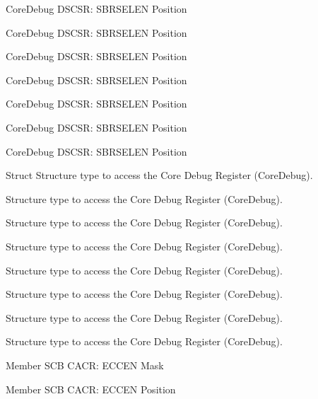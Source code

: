 \begin{DoxyRefList}
\label{deprecated__deprecated000650}%
%
Core\+Debug DSCSR\+: SBRSELEN Position 

\label{deprecated__deprecated000097}%
%
Core\+Debug DSCSR\+: SBRSELEN Position 

\label{deprecated__deprecated000548}%
%
Core\+Debug DSCSR\+: SBRSELEN Position 

\label{deprecated__deprecated000151}%
%
Core\+Debug DSCSR\+: SBRSELEN Position 

\label{deprecated__deprecated000445}%
%
Core\+Debug DSCSR\+: SBRSELEN Position 

\label{deprecated__deprecated000369}%
%
Core\+Debug DSCSR\+: SBRSELEN Position 

\label{deprecated__deprecated000290}%
%
Core\+Debug DSCSR\+: SBRSELEN Position  
\item[Struct \doxylink{structCoreDebug__Type}{Core\+Debug\+\_\+\+Type} ]\label{deprecated__deprecated000104}%
%
Structure type to access the Core Debug Register (Core\+Debug). 

\label{deprecated__deprecated000557}%
%
Structure type to access the Core Debug Register (Core\+Debug). 

\label{deprecated__deprecated000158}%
%
Structure type to access the Core Debug Register (Core\+Debug). 

\label{deprecated__deprecated000455}%
%
Structure type to access the Core Debug Register (Core\+Debug). 

\label{deprecated__deprecated000243}%
%
Structure type to access the Core Debug Register (Core\+Debug). 

\label{deprecated__deprecated000376}%
%
Structure type to access the Core Debug Register (Core\+Debug). 

\label{deprecated__deprecated000300}%
%
Structure type to access the Core Debug Register (Core\+Debug). 

\label{deprecated__deprecated000004}%
%
Structure type to access the Core Debug Register (Core\+Debug).  
\item[Member \doxylink{group__CMSIS__SCB_ga7456a0b93710e8b9fa2b94c946e96c5c}{SCB\+\_\+\+CACR\+\_\+\+ECCEN\+\_\+\+Msk} ]\label{deprecated__deprecated000556}%
%
SCB CACR\+: ECCEN Mask  
\item[Member \doxylink{group__CMSIS__SCB_ga76ce5adcbed2d2d8d425214a1e5d0579}{SCB\+\_\+\+CACR\+\_\+\+ECCEN\+\_\+\+Pos} ]\label{deprecated__deprecated000555}%
%
SCB CACR\+: ECCEN Position 
\end{DoxyRefList}